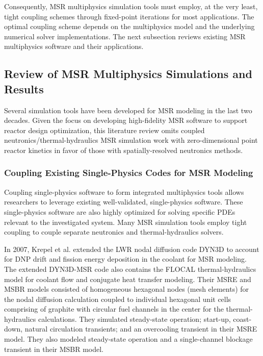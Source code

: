 Consequently, MSR multiphysics simulation tools must employ, at the very least, tight coupling
schemes through fixed-point iterations for most applications. The optimal coupling scheme depends
on the multiphysics model and the underlying numerical solver implementations.
The next subsection reviews existing \gls{MSR} multiphysics software and their applications.

\subsection{Review of MSR Multiphysics Simulations and Results} \label{sec:msr-tools}

Several simulation tools have been developed for \gls{MSR} modeling in the last two decades. Given
the focus on developing high-fidelity \gls{MSR} software to support reactor design optimization,
this literature review omits coupled neutronics/thermal-hydraulics MSR simulation work with
zero-dimensional point reactor kinetics in favor of those with spatially-resolved neutronics
methods.

\subsubsection{Coupling Existing Single-Physics Codes for MSR Modeling}

Coupling single-physics software to form integrated multiphysics tools allows researchers to
leverage existing well-validated, single-physics software. These single-physics software are also
highly optimized for solving specific \glspl{PDE} relevant to the investigated system.
Many \gls{MSR} simulation tools employ tight coupling to couple separate neutronics and
thermal-hydraulics solvers.

In 2007, Krepel et al. \cite{krepel_dyn3d-msr_2007} extended the
\gls{LWR} nodal diffusion code DYN3D to account for \gls{DNP} drift and fission energy deposition
in the coolant for \gls{MSR} modeling. The extended DYN3D-MSR code also contains the FLOCAL
thermal-hydraulics model for coolant flow and conjugate heat transfer modeling. Their \gls{MSRE}
and \gls{MSBR} models consisted of homogeneous hexagonal nodes (mesh elements) for the nodal
diffusion calculation coupled to individual hexagonal unit cells comprising of graphite with
circular fuel channels in the center for the thermal-hydraulics calculations. They simulated
steady-state operation; start-up, coast-down, natural circulation transients; and an overcooling
transient in their \gls{MSRE} model. They also modeled steady-state operation and a single-channel
blockage transient in their \gls{MSBR} model.

